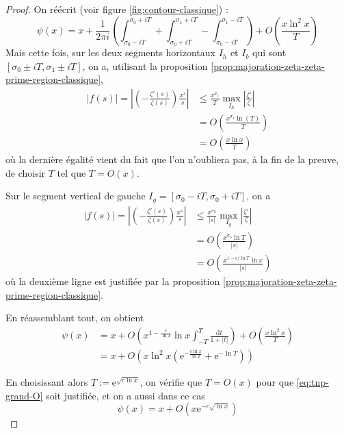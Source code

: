 \documentclass[french]{report}
\begin{document}
\begin{proof}
  On réécrit (voir figure \ref{fig:contour-classique}) :
  \begin{equation}\label{eq:tnp-3-integrales}
    \psi(x) = x +\frac{1}{2\pi i}\left(
      \int_{\sigma_0-iT}^{\sigma_0+iT}
      +\int_{\sigma_0+iT}^{\sigma_1+iT}
      -\int_{\sigma_0-iT}^{\sigma_1-iT}
    \right)
    +O\left(\frac{x\ln^2x}{T}\right)
  \end{equation}
  Mais cette fois, sur les deux segments horizontaux $I_h$ et $I_b$ qui sont $[\sigma_0\pm iT,\sigma_1\pm iT]$, on a, utilisant la proposition \ref{prop:majoration-zeta-zeta-prime-region-classique},
  \begin{align}
    |f(s)| = \left|\left(-\frac{\zeta'(s)}{\zeta(s)}\right)\frac{x^s}{s}\right| & \leq\frac{x^{\sigma_1}}{T}\max_{I_h}\left|\frac{\zeta'}{\zeta}\right| \\
    & = O\left(\frac{x^{\sigma_1}\ln(T)}{T}\right) \\
    & = O\left(\frac{x\ln x}{T}\right) \label{eq:tnp-grand-O}
  \end{align}
  où la dernière égalité vient du fait que l'on n'oubliera pas, à la fin de la preuve, de choisir $T$ tel que $T=O(x)$.

  Sur le segment vertical de gauche $I_g=[\sigma_0-iT, \sigma_0+iT]$, on a
  \begin{align*}
    |f(s)| = \left|\left(-\frac{\zeta'(s)}{\zeta(s)}\right)\frac{x^s}{s}\right| & \leq\frac{x^{\sigma_0}}{|s|}\max_{I_g}\left|\frac{\zeta'}{\zeta}\right| \\
    & = O\left(\frac{x^{\sigma_0}\ln T}{|s|}\right) \\
    & = O\left(\frac{x^{1-c/\ln T}\ln x}{|s|}\right)
  \end{align*}
  où la deuxième ligne est justifiée par la proposition \ref{prop:majoration-zeta-zeta-prime-region-classique}.

  En réassemblant tout, on obtient
  \begin{align*}
    \psi(x) &= x + O\left(x^{1-\frac{c}{\ln T}}\ln x\int_{-T}^T\frac{\mathrm{d}t}{1+|t|}\right) + O\left(\frac{x\ln^2x}{T}\right) \\
    &= x + O\left(x\ln^2 x\left(\mathrm{e}^{-\frac{c\ln x}{\ln T}}+\mathrm{e}^{-\ln T}\right)\right)
  \end{align*}

  En choisissant alors $T:=\mathrm{e}^{\sqrt{c\ln x}}$, on vérifie que $T=O(x)$ pour que \ref{eq:tnp-grand-O} soit justifiée, et on a aussi dans ce cas
  \[ \psi(x)=x+O(x\mathrm{e}^{-c\sqrt{\ln x}}) \]
\end{proof}
\end{document}
